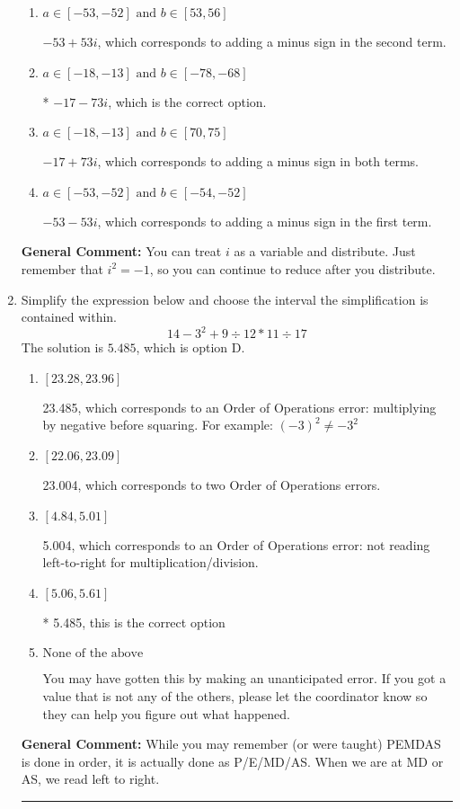 \documentclass{extbook}[14pt]
\newcommand{\litem}[1]{\item #1

\rule{\textwidth}{0.4pt}}
\begin{document}
\begin{enumerate}
{\begin{enumerate}[label=\Alph*.]
 $-35 - 18 i$, which corresponds to just multiplying the real terms to get the real part of the solution and the coefficients in the complex terms to get the complex part.
\item \( a \in [-53, -52] \text{ and } b \in [53, 56] \)

 $-53 + 53 i$, which corresponds to adding a minus sign in the second term.
\item \( a \in [-18, -13] \text{ and } b \in [-78, -68] \)

* $-17 - 73 i$, which is the correct option.
\item \( a \in [-18, -13] \text{ and } b \in [70, 75] \)

 $-17 + 73 i$, which corresponds to adding a minus sign in both terms.
\item \( a \in [-53, -52] \text{ and } b \in [-54, -52] \)

 $-53 - 53 i$, which corresponds to adding a minus sign in the first term.
\end{enumerate}

\textbf{General Comment:} You can treat $i$ as a variable and distribute. Just remember that $i^2=-1$, so you can continue to reduce after you distribute.
}
\litem{
Simplify the expression below and choose the interval the simplification is contained within.
\[ 14 - 3^2 + 9 \div 12 * 11 \div 17 \]The solution is \( 5.485 \), which is option D.\begin{enumerate}[label=\Alph*.]
\item \( [23.28, 23.96] \)

 23.485, which corresponds to an Order of Operations error: multiplying by negative before squaring. For example: $(-3)^2 \neq -3^2$
\item \( [22.06, 23.09] \)

 23.004, which corresponds to two Order of Operations errors.
\item \( [4.84, 5.01] \)

 5.004, which corresponds to an Order of Operations error: not reading left-to-right for multiplication/division.
\item \( [5.06, 5.61] \)

* 5.485, this is the correct option
\item \( \text{None of the above} \)

 You may have gotten this by making an unanticipated error. If you got a value that is not any of the others, please let the coordinator know so they can help you figure out what happened.
\end{enumerate}

\textbf{General Comment:} While you may remember (or were taught) PEMDAS is done in order, it is actually done as P/E/MD/AS. When we are at MD or AS, we read left to right.
}
\end{enumerate}
\end{document}
